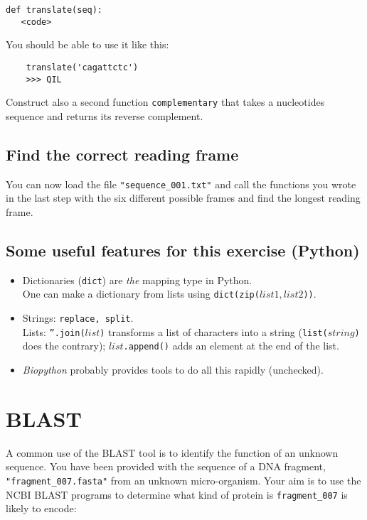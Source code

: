 \documentclass[a4paper,11pt]{article}
\begin{document}
\begin{verbatim}
def translate(seq): 
   <code>
\end{verbatim}

You should be able to use it like this:
\begin{verbatim}
	translate('cagattctc')
	>>> QIL
\end{verbatim}

Construct also a second function \texttt{complementary} that takes a nucleotides sequence and returns its reverse complement.

\subsection{Find the correct reading frame}
You can now load the file \texttt{"sequence\_001.txt"} and call the functions you wrote in the last step with the six different possible frames and find the longest reading frame.

\subsection{Some useful features for this exercise (Python)}
\begin{itemize}
\item Dictionaries (\texttt{dict}) are \textit{the} mapping type in Python. \\
	  One can make a dictionary from lists using \texttt{dict(zip(}$list1,list2$\texttt{))}.
\item Strings: \texttt{replace, split}. \\
	  Lists: \texttt{''.join(}$list$\texttt{)} transforms a list of characters into a string (\texttt{list(}$string$\texttt{)} does the contrary); $list$\texttt{.append()} adds an element at the end of the list.
\item \textit{Biopython} probably provides tools to do all this rapidly (unchecked).
\end{itemize}


\section{BLAST}
A common use of the BLAST tool is to identify the function of an unknown sequence. You have been provided with the sequence of a DNA fragment, \texttt{"fragment\_007.fasta"} from an unknown micro-organism. Your aim is to use the NCBI BLAST programs to determine what kind of protein is \texttt{fragment\_007} is likely to encode:\\
\end{document}
